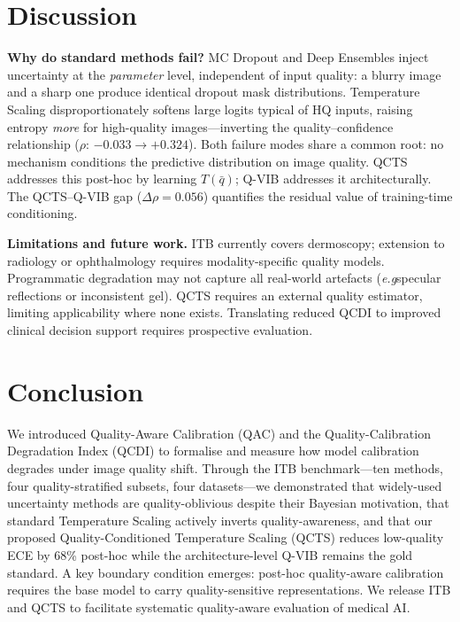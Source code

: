 \documentclass{bmvc2k}
\def\eg{\emph{e.g}\bmvaOneDot}
\newcommand{\qbar}{\bar{q}}
\begin{document}
\section{Discussion}

\textbf{Why do standard methods fail?}
MC Dropout and Deep Ensembles inject uncertainty at the \emph{parameter} level,
independent of input quality: a blurry image and a sharp one produce identical
dropout mask distributions. Temperature Scaling disproportionately softens large
logits typical of HQ inputs, raising entropy \emph{more} for high-quality
images---inverting the quality--confidence relationship ($\rho$: $-0.033
\to +0.324$). Both failure modes share a common root: no mechanism conditions
the predictive distribution on image quality. QCTS addresses this post-hoc by
learning $T(\qbar)$; Q-VIB addresses it architecturally. The QCTS--Q-VIB gap
($\Delta\rho{=}0.056$) quantifies the residual value of training-time
conditioning.

\textbf{Limitations and future work.}
ITB currently covers dermoscopy; extension to radiology or ophthalmology requires
modality-specific quality models. Programmatic degradation may not capture all
real-world artefacts (\eg specular reflections or inconsistent gel). QCTS
requires an external quality estimator, limiting applicability where none exists.
Translating reduced QCDI to improved clinical decision support requires
prospective evaluation.

\section{Conclusion}

We introduced Quality-Aware Calibration (QAC) and the Quality-Calibration
Degradation Index (QCDI) to formalise and measure how model calibration
degrades under image quality shift. Through the ITB benchmark---ten methods,
four quality-stratified subsets, four datasets---we demonstrated that widely-used
uncertainty methods are quality-oblivious despite their Bayesian motivation,
that standard Temperature Scaling actively inverts quality-awareness, and that
our proposed Quality-Conditioned Temperature Scaling (QCTS) reduces low-quality
ECE by 68\% post-hoc while the architecture-level Q-VIB remains the gold
standard. A key boundary condition emerges: post-hoc quality-aware calibration
requires the base model to carry quality-sensitive representations. We release
ITB and QCTS to facilitate systematic quality-aware evaluation of medical AI.


\end{document}
